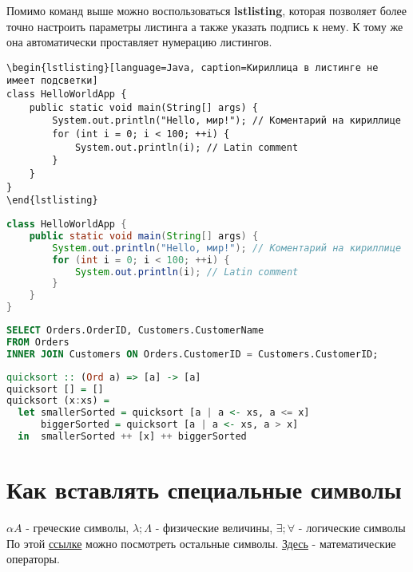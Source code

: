 \newpage
{}

Помимо команд выше можно воспользоваться \textbf{lstlisting}, которая позволяет более точно настроить параметры листинга а также указать подпись к нему. К тому же она автоматически проставляет нумерацию листингов.

\begin{verbatim}
\begin{lstlisting}[language=Java, caption=Кириллица в листинге не имеет подсветки]
class HelloWorldApp {
    public static void main(String[] args) {
        System.out.println("Hello, мир!"); // Коментарий на кириллице
        for (int i = 0; i < 100; ++i) {
            System.out.println(i); // Latin comment
        }
    }
}
\end{lstlisting}
\end{verbatim}




\begin{lstlisting}[language=Java, caption=Кириллица в листинге не имеет подсветки]
class HelloWorldApp {
    public static void main(String[] args) {
        System.out.println("Hello, мир!"); // Коментарий на кириллице
        for (int i = 0; i < 100; ++i) {
            System.out.println(i); // Latin comment
        }
    }
}
\end{lstlisting}

\begin{lstlisting}[language=SQL, caption=Пример на SQL]
SELECT Orders.OrderID, Customers.CustomerName
FROM Orders
INNER JOIN Customers ON Orders.CustomerID = Customers.CustomerID;
\end{lstlisting}

\begin{lstlisting}[language=haskell, caption=Пример на Haskell]
quicksort :: (Ord a) => [a] -> [a]
quicksort [] = []
quicksort (x:xs) =
  let smallerSorted = quicksort [a | a <- xs, a <= x]
      biggerSorted = quicksort [a | a <- xs, a > x]
  in  smallerSorted ++ [x] ++ biggerSorted
\end{lstlisting}








\section{Как вставлять специальные символы}
$\alpha A$ - греческие символы,  $ \lambda; \Lambda$ - физические величины, $\exists; \forall$ - логические символы\\
По этой   \href{https://www.overleaf.com/learn/latex/List_of_Greek_letters_and_math_symbols}{ссылке} можно посмотреть остальные символы. \href{https://www.overleaf.com/learn/latex/Operators}{Здесь} - математические операторы.



